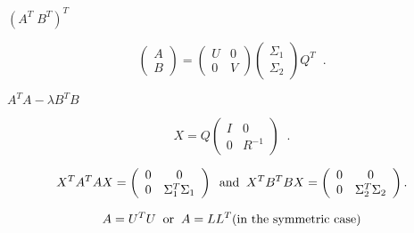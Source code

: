 {\newpage\clearpage
{}%
$(A^T \; B^T)^T$%
\lthtmlinlinemathZ
\lthtmlcheckvsize\clearpage}

{\newpage\clearpage
{}%
\begin{displaymath}
\left( \begin{array}{c} A \\B \end{array} \right) = \left( \begin{array}{cc} U & 0 \\0 & V \end{array} \right) 
\left( \begin{array}{c} \Sigma_1 \\\Sigma_2 \end{array} \right) Q^T \; \; .
\end{displaymath}%
\lthtmldisplayZ
\lthtmlcheckvsize\clearpage}

{\newpage\clearpage
{}%
$A^TA - \lambda B^TB$%
\lthtmlinlinemathZ
\lthtmlcheckvsize\clearpage}

{\newpage\clearpage
{}%
\begin{displaymath}
X = Q \left( \begin{array}{cc} I & 0 \\0 & R^{-1} \end{array} \right) \; \; .
\end{displaymath}%
\lthtmldisplayZ
\lthtmlcheckvsize\clearpage}

{\newpage\clearpage
{}%
\begin{displaymath}
X^T A^T A X = \left( \begin{array}{cc}
                       0 & 0   \\
                       0 & \Sigma^T_1 \Sigma_1
                       \end{array} \right) \;\; {\rm and} \;\;
X^T B^T B X = \left( \begin{array}{cc}
                       0 & 0   \\
                       0 & \Sigma^T_2 \Sigma_2
                       \end{array} \right).
\end{displaymath}%
\lthtmldisplayZ
\lthtmlcheckvsize\clearpage}

{\newpage\clearpage
{}%
\begin{displaymath} A = U^{T}U \; \; {\rm or}\; \; A = LL^{T} \mbox{(in the symmetric case)}\end{displaymath}%
\lthtmldisplayZ
\lthtmlcheckvsize\clearpage}

